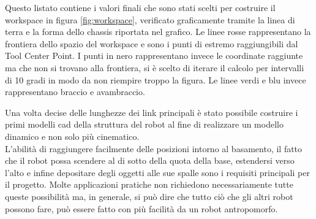 \documentclass[%
corpo=11pt,
twoside,
 stile=classica,
oldstyle,
greek,%
]{toptesi}
\begin{document}
Questo listato contiene i valori finali che sono stati scelti per costruire il workspace in figura \ref{fig:workspace}, verificato graficamente tramite la linea di terra e la forma dello chassis riportata nel grafico. Le linee rosse rappresentano la frontiera dello spazio del workspace e sono i punti di estremo raggiungibili dal Tool Center Point. I punti in nero rappresentano invece le coordinate raggiunte ma che non si trovano alla frontiera, si è scelto di iterare il calcolo per intervalli di 10 gradi in modo da non riempire troppo la figura. Le linee verdi e blu invece rappresentano braccio e avambraccio.


Una volta decise delle lunghezze dei link principali è stato possibile costruire i primi modelli cad della struttura del robot al fine di realizzare un modello dinamico e non solo più cinematico. \\
L'abilità di raggiungere facilmente delle posizioni intorno al basamento, il fatto che il robot possa scendere al di sotto della quota della base, estendersi verso l'alto e infine depositare degli oggetti alle sue spalle sono i requisiti principali per il progetto. 
Molte applicazioni pratiche non richiedono necessariamente tutte queste possibilità ma, in generale, si può dire che tutto ciò che gli altri robot possono fare, può essere fatto con più facilità da un robot antropomorfo.\\
\end{document}
